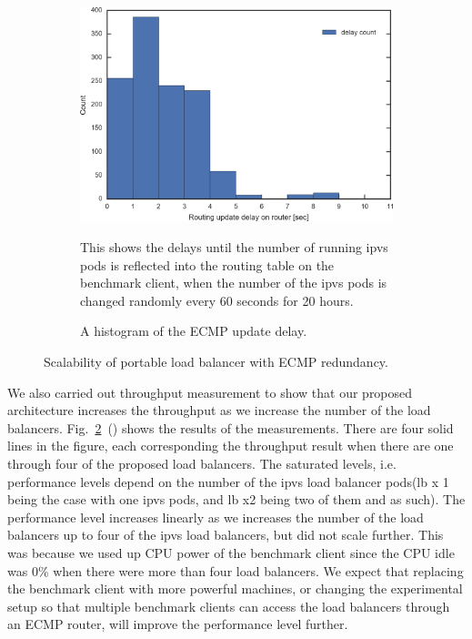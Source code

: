 \begin{figure}[t]
  \par\bigskip

  \begin{subfigure}[t]{\columnwidth}
    \includegraphics[width=0.9\columnwidth,left]{Figs/ecmp_delay_histgram_ieice}
  \caption{A histogram of the ECMP update delay.}
This shows the delays until the number of running ipvs pods is reflected into the routing table on the benchmark client,
when the number of the ipvs pods is changed randomly every 60 seconds for 20 hours.
    \label{fig:ecmp_delay_histgram_ieice}
  \end{subfigure}

  \caption{Scalability of portable load balancer with ECMP redundancy.}
  \label{fig:ecmp_scalability}

\end{figure}

We also carried out throughput measurement to show that our proposed architecture increases the throughput as we increase the number of the load balancers.
Fig.~\ref{fig:ecmp_scalability}~() shows the results of the measurements.
There are four solid lines in the figure, each corresponding the throughput result when there are one through four of the proposed load balancers.
The saturated levels, i.e. performance levels depend on the number of the ipvs load balancer pods(lb x 1 being the case with one ipvs pods, and lb x2 being two of them and as such). The performance level increases linearly as we increases the number of the load balancers up to four of the ipvs load balancers, but did not scale further.
This was because we used up CPU power of the benchmark client since the CPU idle was 0\% when there were more than four load balancers.
We expect that replacing the benchmark client with more powerful machines, or changing the experimental setup so that multiple benchmark clients can access the load balancers through an ECMP router, will improve the performance level further.

